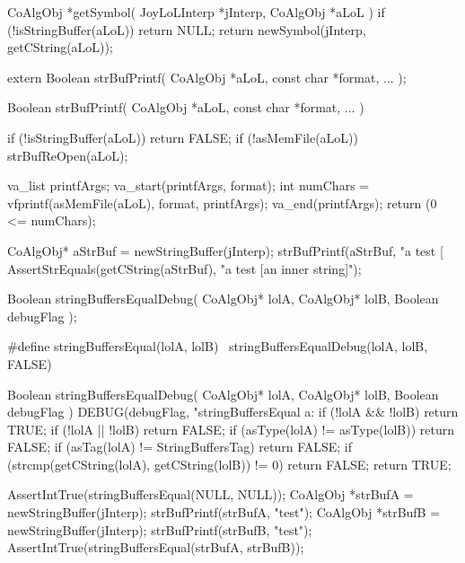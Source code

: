 \startCCode
CoAlgObj *getSymbol(
  JoyLoLInterp *jInterp,
  CoAlgObj     *aLoL
) {
  if (!isStringBuffer(aLoL)) return NULL;
  return newSymbol(jInterp, getCString(aLoL));
}
\stopCCode

\stopTestSuite

\startTestSuite[strBufPrintf]

\startCHeader
extern Boolean strBufPrintf(
  CoAlgObj   *aLoL,
  const char *format, 
  ...
);
\stopCHeader

\startCCode
Boolean strBufPrintf(
  CoAlgObj   *aLoL,
  const char *format,
  ...
) {
  if (!isStringBuffer(aLoL)) return FALSE;
  if (!asMemFile(aLoL)) strBufReOpen(aLoL);
  
  va_list printfArgs;
  va_start(printfArgs, format);
  int numChars = vfprintf(asMemFile(aLoL), format, printfArgs);
  va_end(printfArgs);
  return (0 <= numChars);
}
\stopCCode

\startCTest
  CoAlgObj* aStrBuf = newStringBuffer(jInterp);
  strBufPrintf(aStrBuf, "a test [%
  AssertStrEquals(getCString(aStrBuf), "a test [an inner string]");
\stopCTest
\stopTestCase
\stopTestSuite


\startCHeader
Boolean stringBuffersEqualDebug(
  CoAlgObj* lolA,
  CoAlgObj* lolB,
  Boolean debugFlag
);

#define stringBuffersEqual(lolA, lolB) \
  stringBuffersEqualDebug(lolA, lolB, FALSE)
\stopCHeader

\startCCode
Boolean stringBuffersEqualDebug(
  CoAlgObj* lolA,
  CoAlgObj* lolB,
  Boolean debugFlag
) {
  DEBUG(debugFlag, "stringBuffersEqual a:%
  if (!lolA && !lolB) return TRUE;
  if (!lolA || !lolB) return FALSE;
  if (asType(lolA) != asType(lolB)) return FALSE;
  if (asTag(lolA)  != StringBuffersTag) return FALSE;
  if (strcmp(getCString(lolA), getCString(lolB)) != 0) return FALSE;
  return TRUE;
}
\stopCCode


\startCTest
  AssertIntTrue(stringBuffersEqual(NULL, NULL));
  CoAlgObj *strBufA = newStringBuffer(jInterp);
  strBufPrintf(strBufA, "test");
  CoAlgObj *strBufB = newStringBuffer(jInterp);
  strBufPrintf(strBufB, "test");
  AssertIntTrue(stringBuffersEqual(strBufA, strBufB));
\stopCTest
\stopTestCase


